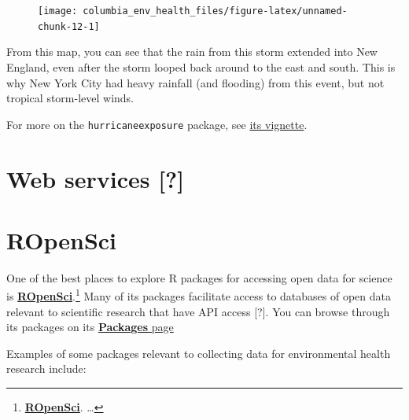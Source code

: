 \documentclass[]{tufte-book}
\begin{document}
\begin{figure}
\texttt{[image: columbia\_env\_health\_files/figure-latex/unnamed-chunk-12-1]} \end{figure}

From this map, you can see that the rain from this storm extended into New
England, even after the storm looped back around to the east and south. This is
why New York City had heavy rainfall (and flooding) from this event, but not
tropical storm-level winds.

For more on the \texttt{hurricaneexposure} package, see \href{https://cran.r-project.org/web/packages/hurricaneexposure/vignettes/hurricaneexposure.html}{its vignette}.

\hypertarget{web-services}{%
\section{Web services {[}?{]}}\label{web-services}}

\hypertarget{ropensci}{%
\section{ROpenSci}\label{ropensci}}

One of the best places to explore R packages for accessing open data for science is
\href{https://ropensci.org/}{\textbf{ROpenSci}}.\footnote{\href{https://ropensci.org/}{\textbf{ROpenSci}}. \ldots{}}
Many of its packages facilitate access to databases of open data relevant to scientific
research that have API access {[}?{]}. You can browse through its packages on
its \href{https://ropensci.org/packages/}{\textbf{Packages} page}

Examples of some packages relevant to collecting data for environmental health research
include:
\end{document}
